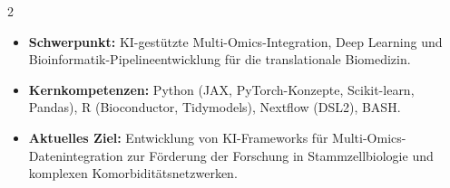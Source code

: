 \documentclass{thejus_cv}
\begin{document}
\begin{paracol}{2}


\begin{itemize}[label=\textbullet, leftmargin=1em]
    \item \textbf{Schwerpunkt:} KI-gest\"utzte Multi-Omics-Integration, Deep Learning und Bioinformatik-Pipelineentwicklung f\"ur die translationale Biomedizin.
    \item \textbf{Kernkompetenzen:} Python (JAX, PyTorch-Konzepte, Scikit-learn, Pandas), R (Bioconductor, Tidymodels), Nextflow (DSL2), BASH.
    \item \textbf{Aktuelles Ziel:} Entwicklung von KI-Frameworks f\"ur Multi-Omics-Datenintegration zur F\"orderung der Forschung in Stammzellbiologie und komplexen Komorbidit\"atsnetzwerken.
\end{itemize}



\end{paracol}
\end{document}
